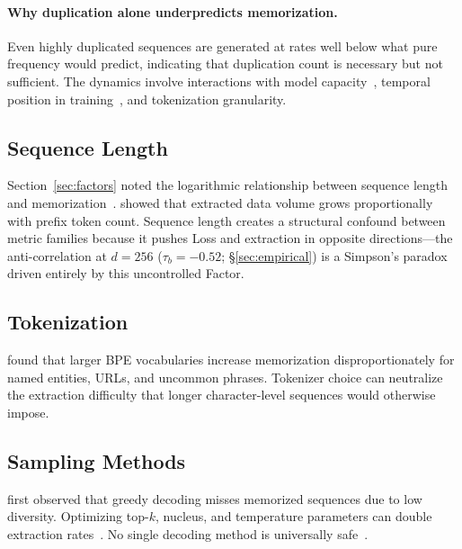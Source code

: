 \documentclass[11pt]{article}
\begin{document}
\paragraph{Why duplication alone underpredicts memorization.}
Even highly duplicated sequences are generated at rates well below what pure
frequency would predict, indicating that duplication count is necessary but
not sufficient.
The dynamics involve interactions with model capacity~\citep{hernandez2022scaling},
temporal position in training~\citep{jagielski2023measuring}, and tokenization
granularity.

\subsection{Sequence Length}
\label{app:sequence-length}

Section~\ref{sec:factors} noted the logarithmic relationship between sequence
length and memorization~\citep{carlini2023quantifyingmemorizationneurallanguage}.
\citet{wang-etal-2024-unlocking} showed that extracted data volume grows
proportionally with prefix token count.
Sequence length creates a structural confound between metric families because
it pushes Loss and extraction in opposite directions---the anti-correlation at
$d{=}256$ ($\tau_b = -0.52$; \S\ref{sec:empirical}) is a Simpson's paradox
driven entirely by this uncontrolled Factor.

\subsection{Tokenization}
\label{app:tokenization}

\citet{kharitonov2021bpe} found that larger BPE vocabularies increase
memorization disproportionately for named entities, URLs, and uncommon
phrases.
Tokenizer choice can neutralize the extraction difficulty that longer
character-level sequences would otherwise impose.

\subsection{Sampling Methods}

\citet{carlini2021extractingtrainingdatalarge} first observed that greedy
decoding misses memorized sequences due to low diversity.
Optimizing top-$k$, nucleus, and temperature parameters can double extraction
rates~\citep{yu2023bag}.
No single decoding method is universally
safe~\citep{tiwari2025sequencelevelleakagerisktraining}.
\end{document}
